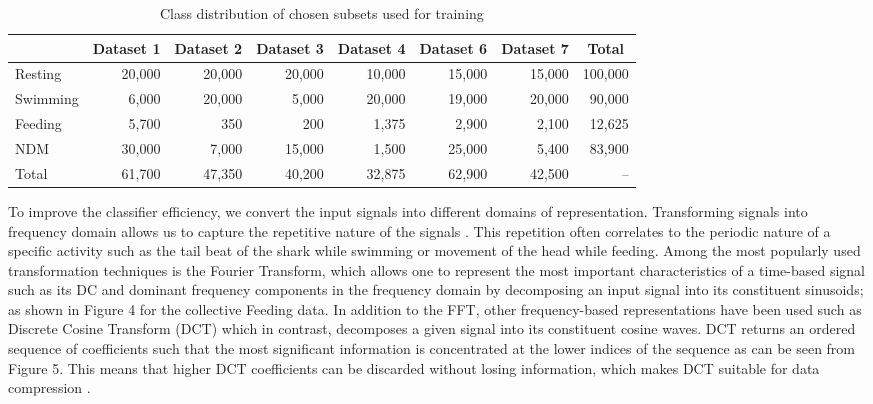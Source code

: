 \documentclass[conference]{IEEEtran}
\begin{document}
\begin{table}[tp!]
	\centering
	\caption{Class distribution of chosen subsets used for training}
	\begin{tabular}{l r r r r r r r}
	\hline
	& \textbf{Dataset 1} & \textbf{Dataset 2} & \textbf{Dataset 3} & \textbf{Dataset 4} & \textbf{Dataset 6} & \textbf{Dataset 7} & \multicolumn{1}{c}{\textbf{Total}}\\
	\hline
	Resting & 20,000 & 20,000 & 20,000 & 10,000 & 15,000 & 15,000 & 100,000 \\
	Swimming & 6,000 & 20,000 & 5,000 & 20,000 & 19,000 & 20,000 & 90,000 \\
	Feeding & 5,700 & 350 & 200 & 1,375 & 2,900 & 2,100 & 12,625 \\
	NDM & 30,000 & 7,000 & 15,000 & 1,500 & 25,000 & 5,400 & 83,900 \\
	Total & 61,700 & 47,350 & 40,200 & 32,875 & 62,900 & 42,500 & -- \\
	\hline
	\end{tabular}
	\label{}
\end{table}
To improve the classifier efficiency, we convert the input signals into different domains of representation. Transforming signals into frequency domain allows us to capture the repetitive nature of the signals \cite{figo}. This repetition often correlates to the periodic nature of a specific activity such as the tail beat of the shark while swimming or movement of the head while feeding.  Among the most popularly used transformation techniques is the Fourier Transform, which allows one to represent the most important characteristics of a time-based signal such as its  DC and dominant frequency components in the frequency domain by decomposing an input signal into its constituent sinusoids; as shown in Figure 4  for the collective Feeding data. In addition to the FFT, other frequency-based representations have been used such as Discrete Cosine Transform (DCT) which in contrast, decomposes a given signal into its constituent cosine waves. DCT returns an ordered sequence of coefficients such that the most significant information is concentrated at the lower indices of the sequence as can be seen from Figure 5.  This means that higher DCT coefficients can be discarded without losing information, which makes DCT suitable for data compression \cite{sani}.
\end{document}
